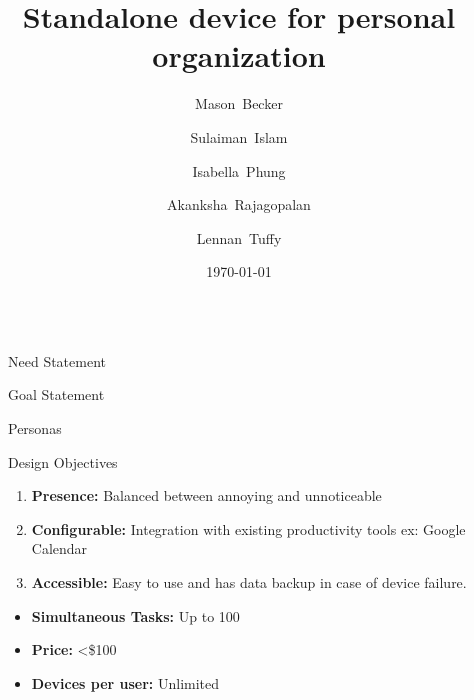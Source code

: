 \documentclass[final]{beamer}
\title{Standalone device for personal organization}
\author{
  Mason~Becker
  \and
  Sulaiman~Islam
  \and
  Isabella~Phung
  \and
  Akanksha~Rajagopalan
  \and
  Lennan~Tuffy
}
\institute[UC Santa Cruz]{CSE 123 - Supervised by Prof. David Harrison}
\date{\today}
\newlength{\sepwidth}
\newlength{\colwidth}
\newcommand{\separatorcolumn}{\begin{column}{\sepwidth}\end{column}}
\begin{document}
\begin{frame}[t]
\begin{columns}[t]
\separatorcolumn

\begin{column}{\colwidth}

  \begin{block}{Need Statement}
    
  \end{block}

  \begin{block}{Goal Statement}
    
  \end{block}

  \begin{block}{Personas} 
  \end{block}
 
  \begin{block}{Design Objectives} 
    \begin{enumerate}
        \item \textbf{Presence:} Balanced between annoying and unnoticeable
        \item \textbf{Configurable:} Integration with existing productivity tools ex: Google Calendar
        \item \textbf{Accessible:} Easy to use and has data backup in case of device failure.
    \end{enumerate}

    \begin{itemize}
        \item \textbf{Simultaneous Tasks:} Up to 100
        \item \textbf{Price:} <\$100
        \item \textbf{Devices per user:} Unlimited
    \end{itemize}

  \end{block}   


\end{column}
\end{columns}
\end{frame}
\end{document}

